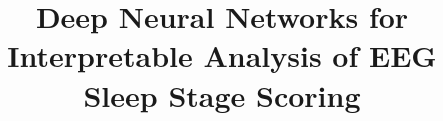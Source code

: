 \documentclass{article}
\title{Deep Neural Networks for Interpretable Analysis of EEG Sleep Stage Scoring}
\begin{document}
\maketitle







%

\label{sec:ref}

%
\end{document}
